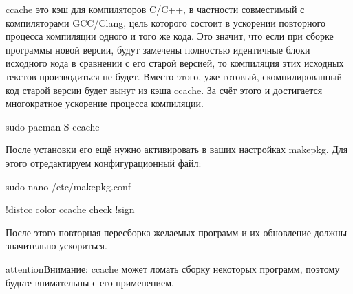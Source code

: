 \documentclass[letterpaper,10pt,russian,openany]{sphinxmanual}
\begin{document}
\sphinxAtStartPar
ccache \sphinxhyphen{} это кэш для компиляторов C/C++, в частности совместимый с компиляторами GCC/Clang,
цель которого состоит в ускорении повторного процесса компиляции одного и того же кода.
Это значит, что если при сборке программы новой версии, будут замечены полностью идентичные блоки исходного кода в сравнении с его старой версией,
то компиляция этих исходных текстов производиться не будет. Вместо этого, уже готовый, скомпилированный код старой версии будет вынут из кэша ccache.
За счёт этого и достигается многократное ускорение процесса компиляции.

\sphinxAtStartPar
{}

\begin{sphinxVerbatim}[commandchars=\\\{\}]
sudo pacman \PYGZhy{}S ccache
\end{sphinxVerbatim}

\sphinxAtStartPar
После установки его ещё нужно активировать в ваших настройках makepkg.
Для этого отредактируем конфигурационный файл:

\begin{sphinxVerbatim}[commandchars=\\\{\}]
sudo nano /etc/makepkg.conf

!distcc color ccache check !sign
\end{sphinxVerbatim}

\sphinxAtStartPar
После этого повторная пересборка желаемых программ и их обновление должны значительно ускориться.

\begin{sphinxadmonition}{attention}{Внимание:}
\sphinxAtStartPar
ccache может ломать сборку некоторых программ, поэтому будьте внимательны с его применением.
\end{sphinxadmonition}

\ignorespaces 
\end{document}
